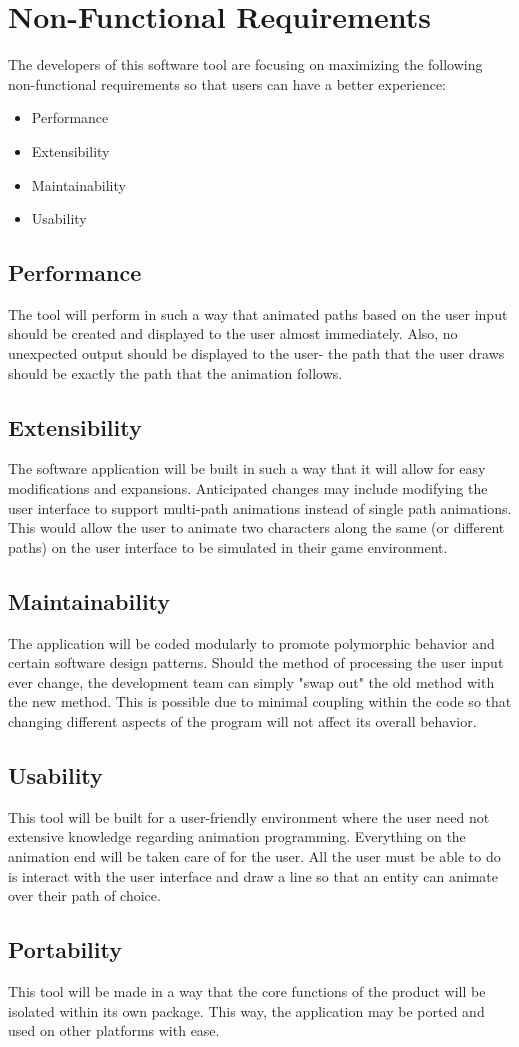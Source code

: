 \section{Non-Functional Requirements}
The developers of this software tool are focusing on maximizing the following non-functional requirements so that users can have a better experience:

\begin{itemize}
 \item Performance
 \item Extensibility
 \item Maintainability
 \item Usability
\end{itemize}

\subsection{Performance}
The tool will perform in such a way that animated paths based on the user input should be created and displayed to the user almost immediately. Also, no unexpected output should be displayed to the user- the path that the user draws should be exactly the path that the animation follows.

\subsection{Extensibility}
The software application will be built in such a way that it will allow for easy modifications and expansions. Anticipated changes may include modifying the user interface to support multi-path animations instead of single path animations. This would allow the user to animate two characters along the same (or different paths) on the user interface to be simulated in their game environment.

\subsection{Maintainability}
The application will be coded modularly to promote polymorphic behavior and certain software design patterns. Should the method of processing the user input ever change, the development team can simply "swap out" the old method with the new method. This is possible due to minimal coupling within the code so that changing different aspects of the program will not affect its overall behavior.

\subsection{Usability}
This tool will be built for a user-friendly environment where the user need not extensive knowledge regarding animation programming. Everything on the animation end will be taken care of for the user. All the user must be able to do is interact with the user interface and draw a line so that an entity can animate over their path of choice.

\subsection{Portability}
This tool will be made in a way that the core functions of the product will be isolated within its own package. This way, the application may be ported and used on other platforms with ease.
